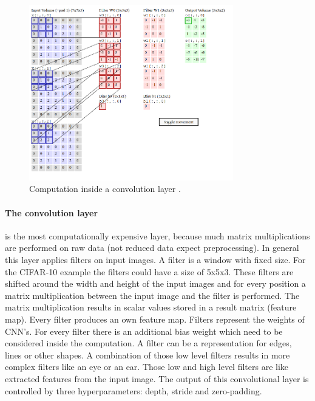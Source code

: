 \documentclass[conference]{IEEEtran}
\begin{document}
\begin{figure}[!t]
\centering
\includegraphics[width=3.5in]{convolutional_layer}
\caption{Computation inside a convolution layer \cite{KarpathyCNN}.}
\label{fig:convolutional_layer}
\end{figure}

\paragraph{The convolution layer} is the most computationally expensive layer, because much matrix multiplications are performed on raw data (not reduced data expect preprocessing). In general this layer applies filters on input images. A filter is a window with fixed size. For the CIFAR-10 example the filters could have a size of 5x5x3. These filters are shifted around the width and height of the input images and for every position a matrix multiplication between the input image and the filter is performed. The matrix multiplication results in scalar values stored in a result matrix (feature map). Every filter produces an own feature map. Filters represent the weights of CNN's. For every filter there is an additional bias weight which need to be considered inside the computation. A filter can be a representation for edges, lines or other shapes. A combination of those low level filters results in more complex filters like an eye or an ear. Those low and high level filters are like extracted features from the input image. The output of this convolutional layer is controlled by three hyperparameters: depth, stride and zero-padding. \\
\end{document}
